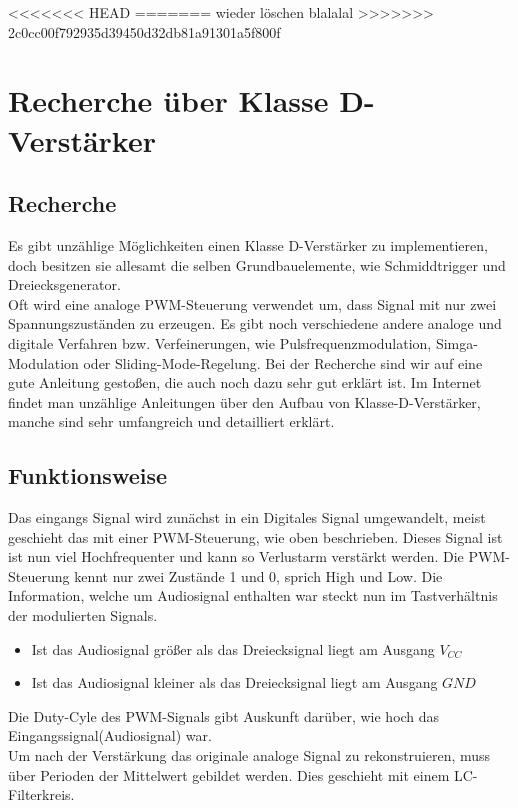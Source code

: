 \documentclass[11pt,a4paper,bibtotoc,oneside]{scrbook}
\begin{document}
<<<<<<< HEAD
=======
wieder löschen blalalal
>>>>>>> 2c0cc00f792935d39450d32db81a91301a5f800f
\newpage

\tableofcontents\thispagestyle{empty}
\newpage

\setcounter{page}{1}
\chapter[Recherche über Klasse D-Verstärker]{Recherche über Klasse D-Verstärker}

\section{Recherche}
Es gibt unzählige Möglichkeiten einen Klasse D-Verstärker zu
implementieren, doch besitzen sie allesamt die selben
Grundbauelemente, wie Schmiddtrigger und Dreiecksgenerator.\\ Oft wird eine analoge PWM-Steuerung verwendet um, dass
Signal mit nur zwei Spannungszuständen zu erzeugen. Es gibt noch verschiedene andere analoge und digitale Verfahren
bzw. Verfeinerungen, wie Pulsfrequenzmodulation, Simga-Modulation oder
Sliding-Mode-Regelung.\textcolor{blue}{\cite{digWik}}
Bei der Recherche sind wir auf eine gute Anleitung gestoßen, die auch noch dazu sehr gut erklärt
ist.\textcolor{blue}{\cite{cae}}
Im Internet findet man unzählige Anleitungen über den Aufbau von Klasse-D-Verstärker, manche sind sehr umfangreich und
detailliert erklärt.
\section{Funktionsweise}
Das eingangs Signal wird zunächst in ein Digitales Signal umgewandelt, meist geschieht das mit einer PWM-Steuerung, wie
oben beschrieben. Dieses Signal ist ist nun viel Hochfrequenter und kann so Verlustarm verstärkt werden. Die
PWM-Steuerung kennt nur zwei Zustände 1 und 0, sprich High und Low. Die Information, welche um Audiosignal enthalten
war steckt nun im Tastverhältnis der modulierten Signals.
\begin{itemize}
    \item Ist das Audiosignal größer als das Dreiecksignal liegt am Ausgang $V_{CC}$
    \item Ist das Audiosignal kleiner als das Dreiecksignal liegt am Ausgang $GND$
\end{itemize}
Die Duty-Cyle des PWM-Signals gibt Auskunft darüber, wie hoch das Eingangssignal(Audiosignal) war.\\
Um nach der Verstärkung das originale analoge Signal zu rekonstruieren, muss über Perioden der Mittelwert gebildet
werden. Dies geschieht mit einem LC-Filterkreis.
\end{document}
